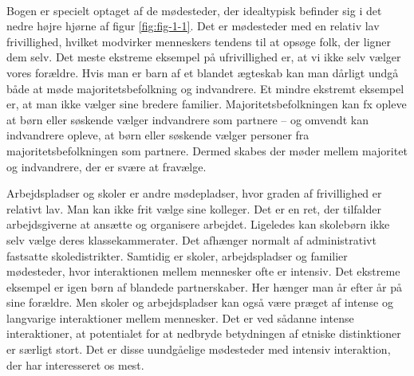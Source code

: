 \documentclass[
]{book}
\begin{document}
~~

Bogen er specielt optaget af de mødesteder, der idealtypisk befinder sig i det nedre højre hjørne af figur \ref{fig:fig-1-1}. Det er mødesteder med en relativ lav frivillighed, hvilket modvirker menneskers tendens til at opsøge folk, der ligner dem selv. Det meste ekstreme eksempel på ufrivillighed er, at vi ikke selv vælger vores forældre. Hvis man er barn af et blandet ægteskab kan man dårligt undgå både at møde majoritetsbefolkning og indvandrere. Et mindre ekstremt eksempel er, at man ikke vælger sine bredere familier. Majoritetsbefolkningen kan fx opleve at børn eller søskende vælger indvandrere som partnere -- og omvendt kan indvandrere opleve, at børn eller søskende vælger personer fra majoritetsbefolkningen som partnere. Dermed skabes der møder mellem majoritet og indvandrere, der er svære at fravælge.

Arbejdspladser og skoler er andre mødepladser, hvor graden af frivillighed er relativt lav. Man kan ikke frit vælge sine kolleger. Det er en ret, der tilfalder arbejdsgiverne at ansætte og organisere arbejdet. Ligeledes kan skolebørn ikke selv vælge deres klassekammerater. Det afhænger normalt af administrativt fastsatte skoledistrikter. Samtidig er skoler, arbejdspladser og familier mødesteder, hvor interaktionen mellem mennesker ofte er intensiv. Det ekstreme eksempel er igen børn af blandede partnerskaber. Her hænger man år efter år på sine forældre. Men skoler og arbejdspladser kan også være præget af intense og langvarige interaktioner mellem mennesker. Det er ved sådanne intense interaktioner, at potentialet for at nedbryde betydningen af etniske distinktioner er særligt stort. Det er disse uundgåelige mødesteder med intensiv interaktion, der har interesseret os mest.
\end{document}
